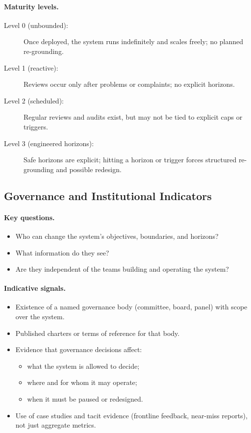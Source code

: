 \paragraph{Maturity levels.}

\begin{description}
  \item[Level 0 (unbounded):]
    Once deployed, the system runs indefinitely and scales freely; no
    planned re-grounding.
  \item[Level 1 (reactive):]
    Reviews occur only after problems or complaints; no explicit
    horizons.
  \item[Level 2 (scheduled):]
    Regular reviews and audits exist, but may not be tied to explicit
    caps or triggers.
  \item[Level 3 (engineered horizons):]
    Safe horizons are explicit; hitting a horizon or trigger forces
    structured re-grounding and possible redesign.
\end{description}

\subsection{Governance and Institutional Indicators}

\paragraph{Key questions.}

\begin{itemize}
  \item Who can change the system’s objectives, boundaries, and
        horizons?
  \item What information do they see?
  \item Are they independent of the teams building and operating the
        system?
\end{itemize}

\paragraph{Indicative signals.}

\begin{itemize}
  \item Existence of a named governance body (committee, board, panel)
        with scope over the system.
  \item Published charters or terms of reference for that body.
  \item Evidence that governance decisions affect:
        \begin{itemize}
          \item what the system is allowed to decide;
          \item where and for whom it may operate;
          \item when it must be paused or redesigned.
        \end{itemize}
  \item Use of case studies and tacit evidence (frontline feedback,
        near-miss reports), not just aggregate metrics.
\end{itemize}

